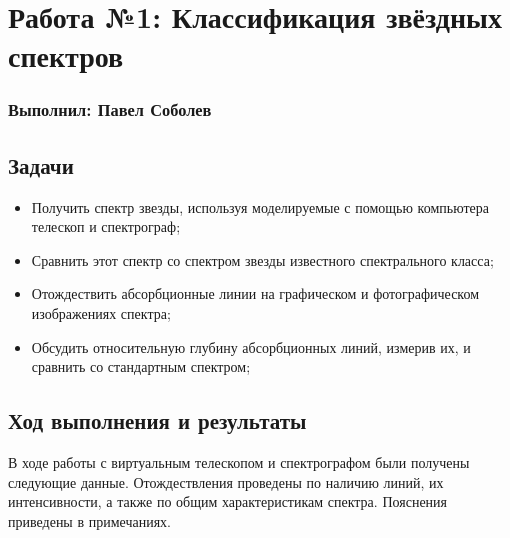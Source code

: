 

\usepackage{makecell}



\section*{Работа №1: Классификация звёздных спектров}
\subsubsection*{Выполнил: Павел Соболев}

\vspace{3em}

\subsection*{Задачи}

\begin{itemize}
  \setlength\itemsep{-0.1em}
  \item Получить спектр звезды, используя моделируемые с помощью компьютера телескоп и спектрограф;
  \item Сравнить этот спектр со спектром звезды известного спектрального класса;
  \item Отождествить абсорбционные линии на графическом и фотографическом изображениях спектра;
  \item Обсудить относительную глубину абсорбционных линий, измерив их, и сравнить со стандартным спектром;
\end{itemize}

\subsection*{Ход выполнения и результаты}

В ходе работы с виртуальным телескопом и спектрографом были получены следующие данные.
Отождествления проведены по наличию линий, их интенсивности, а также по общим характеристикам спектра.
Пояснения приведены в примечаниях.

